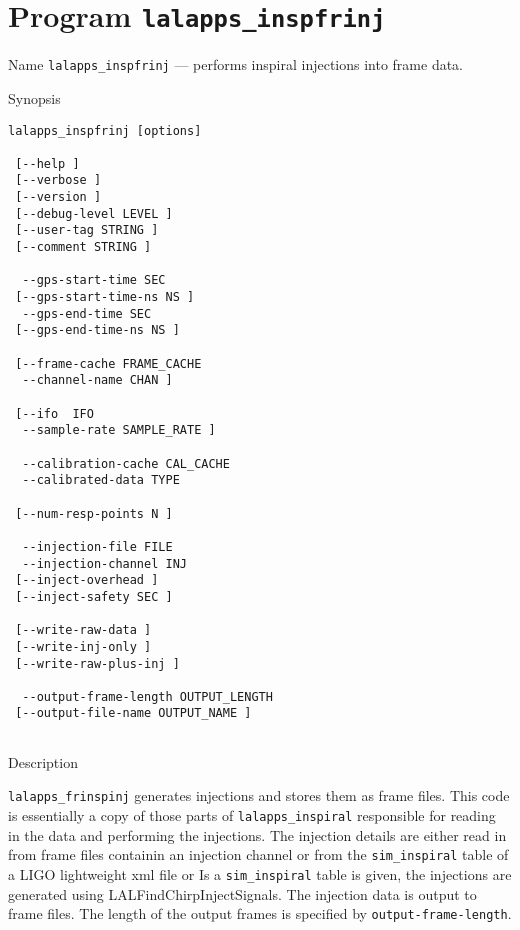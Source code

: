 \section{Program \texttt{lalapps\_inspfrinj}}
\label{program:lalapps-inspfrinj}

\begin{entry}
\item[Name]
\verb$lalapps_inspfrinj$ --- performs inspiral injections into frame data.

\item[Synopsis]
\begin{verbatim}
lalapps_inspfrinj [options]
 
 [--help ]       
 [--verbose ]   
 [--version ]  
 [--debug-level LEVEL ]   
 [--user-tag STRING ]     
 [--comment STRING ]    
 
  --gps-start-time SEC
 [--gps-start-time-ns NS ] 
  --gps-end-time SEC     
 [--gps-end-time-ns NS ] 
 
 [--frame-cache FRAME_CACHE    
  --channel-name CHAN ]  
 
 [--ifo  IFO       
  --sample-rate SAMPLE_RATE ] 

  --calibration-cache CAL_CACHE 
  --calibrated-data TYPE  
  
 [--num-resp-points N ]   
 
  --injection-file FILE
  --injection-channel INJ
 [--inject-overhead ]  
 [--inject-safety SEC ]
 
 [--write-raw-data ] 
 [--write-inj-only ]
 [--write-raw-plus-inj ]
 
  --output-frame-length OUTPUT_LENGTH
 [--output-file-name OUTPUT_NAME ]
 
\end{verbatim}

\item[Description] 

\texttt{lalapps\_frinspinj} generates injections and stores them as
frame files.  This code is essentially a copy of those parts of
\texttt{lalapps\_inspiral} responsible for reading in the data and
performing the injections.  The injection details are either read in
from frame files containin an injection channel or from the
\texttt{sim\_inspiral} table of a LIGO lightweight xml file or Is a
\texttt{sim\_inspiral} table is given, the injections are generated
using LALFindChirpInjectSignals.  The injection data is output to frame
files.  The length of the output frames is specified by
\texttt{output-frame-length}.


\end{entry}
